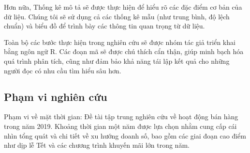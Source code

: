 Hơn nữa, Thống kê mô tả sẽ được thực hiện để hiểu rõ các đặc điểm cơ bản của dữ liệu. Chúng tôi sẽ sử dụng cả các thống kê mẫu (như trung bình, độ lệch chuẩn) và biểu đồ để trình bày các thông tin quan trọng từ dữ liệu.

Toàn bộ các bước thực hiện trong nghiên cứu sẽ được nhóm tác giả triển khai bằng ngôn ngữ R. Các đoạn mã sẽ được chú thích cẩn thận, giúp minh bạch hóa quá trình phân tích, cũng như đảm bảo khả năng tái lập kết quả cho những người đọc có nhu cầu tìm hiểu sâu hơn.
\subsection{Phạm vi nghiên cứu}
Phạm vi về mặt thời gian: Đề tài tập trung nghiên cứu về hoạt động bán hàng trong năm 2019. Khoảng thời gian một năm được lựa chọn nhằm cung cấp cái nhìn tổng quát và chi tiết về xu hướng doanh số, bao gồm các giai đoạn cao điểm như dịp lễ Tết và các chương trình khuyến mãi lớn trong năm.
